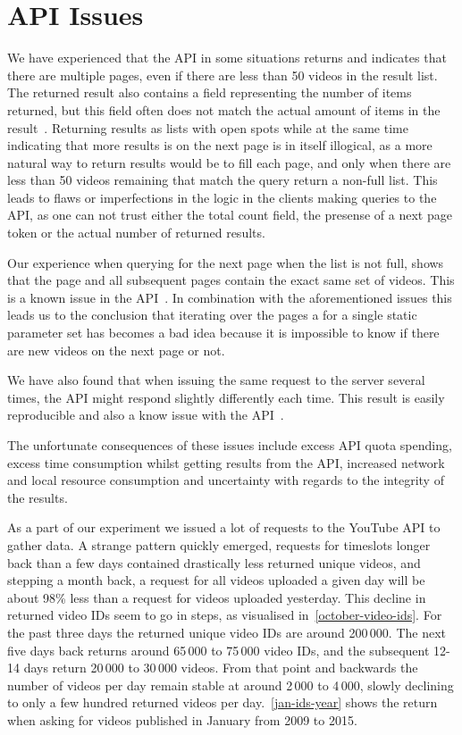 \section{API Issues}
We have experienced that the API in some situations returns and indicates that
there are multiple pages, even if there are less than 50 videos in the result
list. The returned result also contains a field representing the number of items
returned, but this field often does not match the actual amount of items in the 
result~\cite[Issue 5173]{conclusion:gdataissue}. Returning results as lists with
open spots while at the same time indicating that more results is on the next
page is in itself illogical, as a more natural way to return results would be to
fill each page, and only when there are less than 50 videos remaining that match
the query return a non-full list. This leads to flaws or imperfections in the 
logic in the clients making queries to the API, as one can not trust either the
total count field, the presense of a next page token or the actual number of
returned results.

Our experience when querying for the next page when the list is not full, shows
that the page and all subsequent pages contain the exact same set of videos. 
This is a known issue in the API~\cite[Issue 6406]{conclusion:gdataissue}. In 
combination with the aforementioned issues this leads us to the conclusion that 
iterating over the pages a for a single static parameter set has becomes a bad 
idea because it is impossible to know if there are new videos on the next page 
or not. %

We have also found that when issuing the same request to the server several
times, the API might respond slightly differently each time. This result is
easily reproducible and also a know issue with the 
API~\cite[Issue 4275]{conclusion:gdataissue}. 

The unfortunate consequences of these issues include excess API quota spending,
excess time consumption whilst getting results from the API, increased network
and local resource consumption and uncertainty with regards to the integrity of
the results. 

As a part of our experiment we issued a lot of requests to the YouTube API to
gather data. A strange pattern quickly emerged, requests for timeslots longer
back than a few days contained drastically less returned unique videos, and 
stepping a month back, a request for all videos uploaded a given day will be 
about 98\% less than a request for videos uploaded yesterday. This decline in
returned video IDs seem to go in steps, as visualised
in~\cref{october-video-ids}. For the past three days the returned unique video
IDs are around 200\,000. The next five days back returns around 65\,000 to 
75\,000 video IDs, and the subsequent 12-14 days return 20\,000 to 30\,000
videos. From that point and backwards the number of videos per day remain
stable at around 2\,000 to 4\,000, slowly declining to only a few hundred
returned videos per day.~\cref{jan-ids-year} shows the return when asking for 
videos published in January from 2009 to 2015. 

